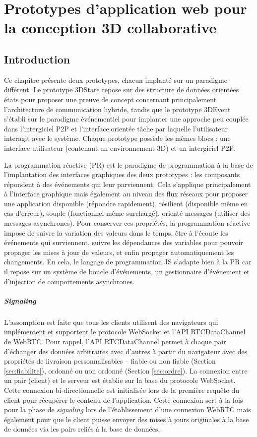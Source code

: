 \chapter{Prototypes d'application web pour la conception 3D collaborative}
\label{sec:chap:proto}
\chaptertable

\section{Introduction}
Ce chapitre présente deux prototypes, chacun implanté sur un paradigme différent.
Le prototype 3DState repose sur des structure de données orientées états pour 
proposer une preuve de concept concernant principalement l'architecture de 
communication hybride, tandis que le prototype 3DEvent s'établi sur le paradigme 
événementiel pour implanter une approche peu couplée dans l'intergiciel \gls{P2P} 
et l'interface.orientée tâche par laquelle l'utilisateur interagit avec le système.
Chaque prototype possède les mêmes blocs : une interface utilisateur (contenant 
un environnement 3D) et un intergiciel \gls{P2P}.


La programmation réactive (PR) est le paradigme de programmation à la base de 
l'implantation des interfaces graphiques des deux prototypes : les composants 
répondent à des événements qui leur parviennent. 
Cela s'applique principalement à l'interface graphique mais 
également au niveau des flux réseaux pour proposer une application disponible 
(répondre rapidement), résilient (disponible même en cas d'erreur), souple 
(fonctionnel même surchargé), orienté messages (utiliser des messages 
asynchrones). Pour conserver ces propriétés, la programmation réactive impose 
de suivre la variation des valeurs dans le temps, être à l'écoute les événements 
qui surviennent, suivre les dépendances des variables pour pouvoir propager les 
mises à jour de valeurs, et enfin propager automatiquement les changements.
En cela, le langage de programmation \gls{JS} s'adapte bien à la PR car il repose 
sur un système de boucle d'événements, un gestionnaire d'événement et 
d'injection de comportements asynchrones. 

\paragraph{Signaling}
L'assomption est faite que tous les clients utilisent des navigateurs qui 
implémentent et supportent le protocole WebSocket et l'\gls{API} 
RTCDataChannel de WebRTC. Pour rappel, l'\gls{API} RTCDataChannel permet à 
chaque pair d'échanger des données arbitraires 
avec d'autres à partir du navigateur avec des propriétés de livraison 
personnalisables -- fiable ou non fiable (Section \ref{sec:fiabilite}), ordonné ou non 
ordonné (Section \ref{sec:ordre}). 
La connexion entre un pair (client) et le serveur est établie sur la base du protocole 
\gls{WebSocket}. Cette connexion bi-directionnelle est initialisée lors de la 
première requête du client pour récupérer le contenu de l'application. Cette 
connexion sert à la fois pour la phase de \textit{signaling} lors de l'établissement 
d'une connexion \gls{WebRTC} mais également pour que le client puisse envoyer 
des mises à jours originales à la base de données via les pairs reliés à la base de 
données. 


